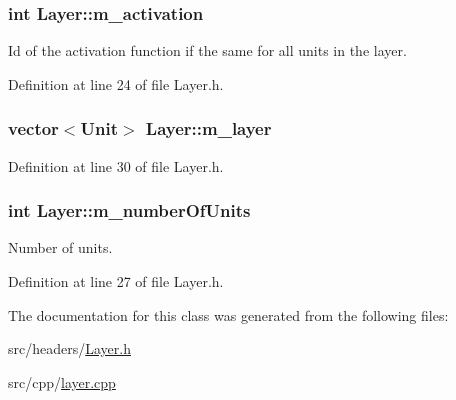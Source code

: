 \subsubsection[{\texorpdfstring{m\+\_\+activation}{m_activation}}]{\setlength{\rightskip}{0pt plus 5cm}int Layer\+::m\+\_\+activation\hspace{0.3cm}{\ttfamily [private]}}\hypertarget{classLayer_a523555bfccf9941e1419f14477b10d4e}{}\label{classLayer_a523555bfccf9941e1419f14477b10d4e}


Id of the activation function if the same for all units in the layer. 



Definition at line 24 of file Layer.\+h.

\subsubsection[{\texorpdfstring{m\+\_\+layer}{m_layer}}]{\setlength{\rightskip}{0pt plus 5cm}vector$<${\bf Unit}$>$ Layer\+::m\+\_\+layer\hspace{0.3cm}{\ttfamily [private]}}\hypertarget{classLayer_af9769c2565629a59ee832f45b50e2324}{}\label{classLayer_af9769c2565629a59ee832f45b50e2324}


Definition at line 30 of file Layer.\+h.

\subsubsection[{\texorpdfstring{m\+\_\+number\+Of\+Units}{m_numberOfUnits}}]{\setlength{\rightskip}{0pt plus 5cm}int Layer\+::m\+\_\+number\+Of\+Units\hspace{0.3cm}{\ttfamily [private]}}\hypertarget{classLayer_afd16f1597c67bcdee0d7f41d1354ed83}{}\label{classLayer_afd16f1597c67bcdee0d7f41d1354ed83}


Number of units. 



Definition at line 27 of file Layer.\+h.



The documentation for this class was generated from the following files\+:\begin{DoxyCompactItemize}
\item 
src/headers/\hyperlink{Layer_8h}{Layer.\+h}\item 
src/cpp/\hyperlink{layer_8cpp}{layer.\+cpp}\end{DoxyCompactItemize}

